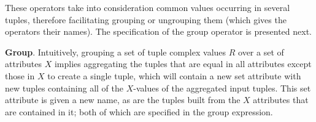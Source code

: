 These operators take into consideration common values occurring in several tuples, therefore facilitating grouping or ungrouping them (which gives the operators their names). The specification of the group operator is presented next.

\vspace*{0.25cm}
\noindent \textbf{Group}. Intuitively, grouping a set of tuple complex values $R$ over a set of attributes $X$ implies aggregating the tuples that are equal in all attributes except those in $X$ to create a single tuple, which will contain a new set attribute with new tuples containing all of the $X$-values of the aggregated input tuples. This set attribute is given a new name, as are the tuples built from the $X$ attributes that are contained in it; both of which are specified in the group expression.

